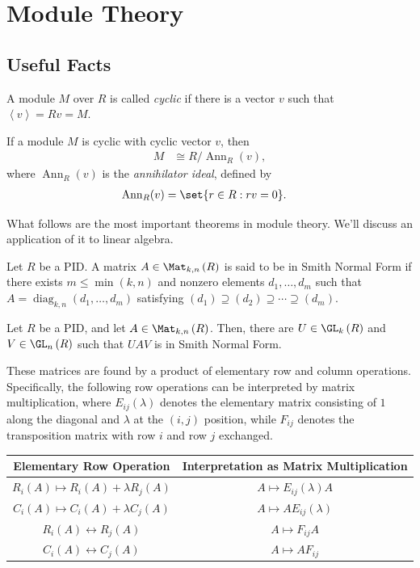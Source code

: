 \documentclass[10pt]{mypackage}
\begin{document}
\section{Module Theory}%
\subsection{Useful Facts}%

\begin{definition}
  A module $M$ over $R$ is called \textit{cyclic} if there is a vector $v$ such that $ \left\langle v \right\rangle = Rv = M $.
\end{definition}
\begin{theorem}
  If a module $M$ is cyclic with cyclic vector $v$, then
  \begin{align*}
    M &\cong R/\operatorname{Ann}_R(v),
  \end{align*}
  where $\operatorname{Ann}_R(v)$ is the \textit{annihilator ideal}, defined by
  \begin{align*}
    \operatorname{Ann}_R(v) &= \set{r\in R : rv = 0}.
  \end{align*}
\end{theorem}
What follows are the most important theorems in module theory. We'll discuss an application of it to linear algebra.
\begin{definition}
  Let $R$ be a PID. A matrix $A\in \Mat_{k,n}\left( R \right)$ is said to be in Smith Normal Form if there exists $m\leq \min\left( k,n \right)$ and nonzero elements $d_1,\dots,d_m$ such that $A = \operatorname{diag}_{k,n}\left( d_1,\dots,d_m \right)$ satisfying $\left( d_1 \right)\supseteq \left( d_2 \right)\supseteq\cdots\supseteq \left( d_m \right)$.
\end{definition}
\begin{theorem}
  Let $R$ be a PID, and let $A\in \Mat_{k,n}\left( R \right)$. Then, there are $U\in \GL_k\left( R \right)$ and $V\in \GL_n\left( R \right)$ such that $UAV$ is in Smith Normal Form.
\end{theorem}
These matrices are found by a product of elementary row and column operations. Specifically, the following row operations can be interpreted by matrix multiplication, where $E_{ij}(\lambda)$ denotes the elementary matrix consisting of $1$ along the diagonal and $\lambda$ at the $(i,j)$ position, while $F_{ij}$ denotes the transposition matrix with row $i$ and row $j$ exchanged.
\begin{center}
  \begin{tabular}{c|c}
    Elementary Row Operation & Interpretation as Matrix Multiplication\\
    \hline
    $R_i(A)\mapsto R_i(A) + \lambda R_j(A)$ & $A\mapsto E_{ij}(\lambda)A$\\
    $C_i(A)\mapsto C_i(A) + \lambda C_j(A)$ & $A\mapsto AE_{ij}(\lambda)$\\
    $R_i(A)\leftrightarrow R_j(A)$ & $A\mapsto F_{ij} A$\\
    $C_i(A)\leftrightarrow C_j(A)$ & $A\mapsto AF_{ij}$
  \end{tabular}
\end{center}
\end{document}
